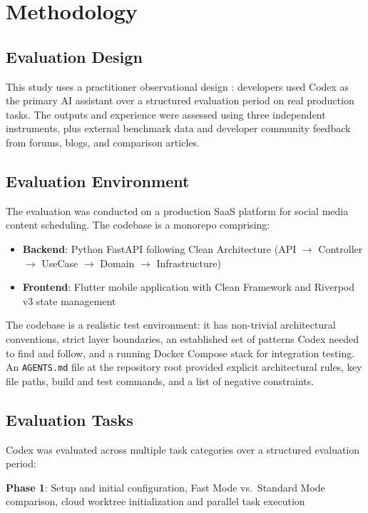 \documentclass[conference]{IEEEtran}
\begin{document}
\section{Methodology}

\subsection{Evaluation Design}
This study uses a practitioner observational design \cite{creswell2018mixed}: developers used Codex as the primary AI assistant over a structured evaluation period on real production tasks. The outputs and experience were assessed using three independent instruments, plus external benchmark data and developer community feedback from forums, blogs, and comparison articles.

\subsection{Evaluation Environment}
The evaluation was conducted on a production SaaS platform for social media content scheduling. The codebase is a monorepo comprising:
\begin{itemize}
    \item \textbf{Backend}: Python FastAPI following Clean Architecture (API $\rightarrow$ Controller $\rightarrow$ UseCase $\rightarrow$ Domain $\rightarrow$ Infrastructure)
    \item \textbf{Frontend}: Flutter mobile application with Clean Framework and Riverpod v3 state management
\end{itemize}

The codebase is a realistic test environment: it has non-trivial architectural conventions, strict layer boundaries, an established set of patterns Codex needed to find and follow, and a running Docker Compose stack for integration testing. An \texttt{AGENTS.md} file at the repository root provided explicit architectural rules, key file paths, build and test commands, and a list of negative constraints.

\subsection{Evaluation Tasks}
Codex was evaluated across multiple task categories over a structured evaluation period:

\textbf{Phase 1}: Setup and initial configuration, Fast Mode vs.\ Standard Mode comparison, cloud worktree initialization and parallel task execution
\end{document}
